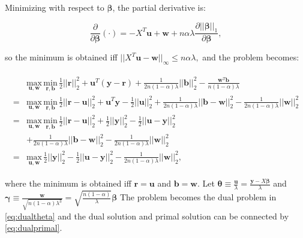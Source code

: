 Minimizing with respect to $\boldsymbol\beta$, the partial derivative is:

\begin{equation}
    \label{eq:partialbeta}
    \frac{\partial}{\partial\boldsymbol\beta}(\cdot) =-X^T\boldsymbol u+\boldsymbol w+n\alpha\lambda\frac{\partial||\boldsymbol\beta||_1}{\partial\boldsymbol\beta},
\end{equation}

so the minimum is obtained iff $||X^T\boldsymbol u-\boldsymbol w||_\infty\leq n\alpha\lambda,$ and the problem becomes:

\begin{gather}
    \label{eq:dualuw}
    \begin{aligned}
        &\underset{\boldsymbol u,\boldsymbol w}{\mathrm{max}}\,\underset{\boldsymbol r,\boldsymbol b}{\mathrm{min}}\,\frac{1}{2}||\boldsymbol r||_2^2+\boldsymbol u^T(\boldsymbol y-\boldsymbol r)+\frac{1}{2n(1-\alpha)\lambda}||\boldsymbol b||_2^2-\frac{\boldsymbol w^T\boldsymbol b}{n(1-\alpha)\lambda}\\
        =&\underset{\boldsymbol u,\boldsymbol w}{\mathrm{max}}\,\underset{\boldsymbol r,\boldsymbol b}{\mathrm{min}}\,\frac{1}{2}||\boldsymbol r-\boldsymbol u||_2^2+\boldsymbol u^T\boldsymbol y-\frac{1}{2}||\boldsymbol u||_2^2+\frac{1}{2n(1-\alpha)\lambda}||\boldsymbol b-\boldsymbol w||_2^2-\frac{1}{2n(1-\alpha)\lambda}||\boldsymbol w||_2^2\\
        =&\underset{\boldsymbol u,\boldsymbol w}{\mathrm{max}}\,\underset{\boldsymbol r,\boldsymbol b}{\mathrm{min}}\,\frac{1}{2}||\boldsymbol r-\boldsymbol u||_2^2+\frac{1}{2}||\boldsymbol y||_2^2-\frac{1}{2}||\boldsymbol u-\boldsymbol y||_2^2\\
        &+\frac{1}{2n(1-\alpha)\lambda}||\boldsymbol b-\boldsymbol w||_2^2-\frac{1}{2n(1-\alpha)\lambda}||\boldsymbol w||_2^2\\
        =&\underset{\boldsymbol u,\boldsymbol w}{\mathrm{max}}\,\frac{1}{2}||\boldsymbol y||_2^2-\frac{1}{2}||\boldsymbol u-\boldsymbol y||_2^2-\frac{1}{2n(1-\alpha)\lambda}||\boldsymbol w||_2^2,
    \end{aligned}
\end{gather}

where the minimum is obtained iff $\boldsymbol r=\boldsymbol u$ and $\boldsymbol b=\boldsymbol w$. Let $\boldsymbol\theta\equiv\frac{\boldsymbol u}{\lambda}=\frac{\boldsymbol y-X\boldsymbol\beta}{\lambda}$ and $\boldsymbol\gamma\equiv\frac{\boldsymbol w}{\sqrt{n(1-\alpha)\lambda^3}}=\sqrt{\frac{n(1-\alpha)}{\lambda}}\boldsymbol\beta$ The problem becomes the dual problem in \eqref{eq:dualtheta} and the dual solution and primal solution can be connected by \eqref{eq:dualprimal}.

